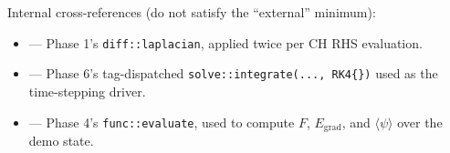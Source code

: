 Internal cross-references (do not satisfy the ``external'' minimum):

\begin{itemize}
\tightlist
\item
   --- Phase 1's
  \passthrough{\lstinline!diff::laplacian!}, applied twice per CH RHS
  evaluation.
\item
   --- Phase 6's
  tag-dispatched \passthrough{\lstinline!solve::integrate(..., RK4{})!}
  used as the time-stepping driver.
\item
   --- Phase 4's
  \passthrough{\lstinline!func::evaluate!}, used to compute \(F\),
  \(E_{\text{grad}}\), and \(\langle\psi\rangle\) over the demo state.
\end{itemize}
